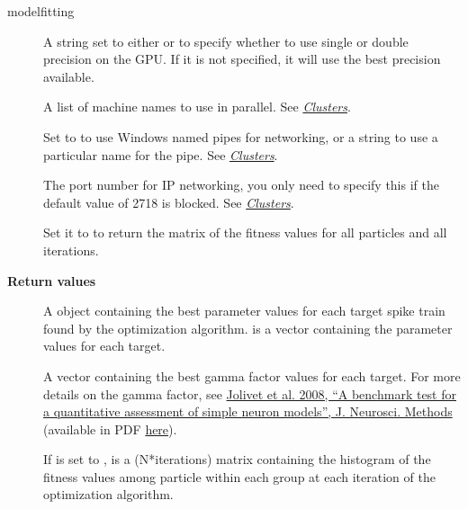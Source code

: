 \documentclass[letterpaper,10pt,english]{manual}
\begin{document}
\begin{funcdesc}{modelfitting}
\begin{description}
\item[] \leavevmode
A string set to either  or  to specify whether to use
single or double precision on the GPU. If it is not specified, it will
use the best precision available.

\item[] \leavevmode
A list of machine names to use in parallel. See \hyperlink{modelfitting-clusters}{\emph{Clusters}}.

\item[] \leavevmode
Set to  to use Windows named pipes for networking, or a string
to use a particular name for the pipe. See \hyperlink{modelfitting-clusters}{\emph{Clusters}}.

\item[] \leavevmode
The port number for IP networking, you only need to specify this if the
default value of 2718 is blocked. See \hyperlink{modelfitting-clusters}{\emph{Clusters}}.

\item[] \leavevmode
Set it to  to return the matrix of the fitness values for all particles and all iterations.

\end{description}

\textbf{Return values}
\begin{description}
\item[] \leavevmode
A \hyperlink{brian.Parameters}{} object containing the best parameter values for each target spike train
found by the optimization algorithm.  is a vector containing
the parameter values for each target.

\item[] \leavevmode
A vector containing the best gamma factor values for each target.
For more details on the gamma factor, see
\href{http://www.ncbi.nlm.nih.gov/pubmed/18160135}{Jolivet et al. 2008, ``A benchmark test for a quantitative assessment of simple neuron models'', J. Neurosci. Methods} (available in PDF
\href{http://icwww.epfl.ch/~gerstner/PUBLICATIONS/Jolivet08.pdf}{here}).

\item[] \leavevmode
If  is set to ,  is a (N*iterations) matrix
containing the histogram of the fitness values among particle within each group at each 
iteration of the optimization algorithm.

\end{description}
\end{funcdesc}
\end{document}
